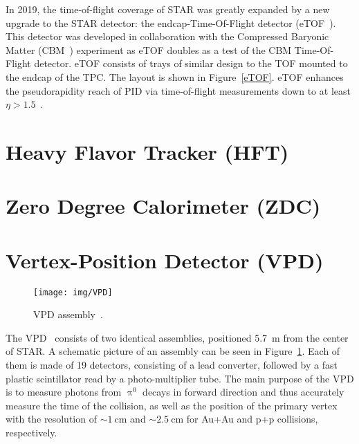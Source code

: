 In 2019, the time-of-flight coverage of STAR was greatly expanded by a new upgrade to the STAR detector: the endcap-Time-Of-Flight detector (eTOF~\cite{eTOF})\@. This detector was developed in collaboration with the Compressed Baryonic Matter (CBM~\cite{CBM}) experiment as eTOF doubles as a test of the CBM Time-Of-Flight detector. eTOF consists of trays of similar design to the TOF mounted to the endcap of the TPC\@. The layout is shown in Figure~\ref{eTOF}\@. eTOF enhances the pseudorapidity reach of PID via time-of-flight measurements down to at least $\eta > 1.5$~\cite{eTOF_LOI}\@.


\section{Heavy Flavor Tracker (HFT)\label{HFTsection}} 



\section{Zero Degree Calorimeter (ZDC)\label{ZDCsection}}






\section{Vertex-Position Detector (VPD)\label{VPD}}

\begin{figure}[!htb]
\begin{center}
 \texttt{[image: img/VPD]}\\
\end{center}
\caption[VPD assembly.]{\label{VPDassembly}VPD assembly~\cite{VPD}.}
\end{figure}

The VPD~\cite{VPD} consists of two identical assemblies, positioned \SI{5.7}{\metre} from the center of STAR\@. A schematic 
picture of an assembly can be seen in Figure~\ref{VPDassembly}. Each of them is made of 19 detectors, consisting of a lead 
converter, followed by a fast plastic scintillator read by a photo-multiplier tube. The main purpose of the VPD is to measure 
photons from $\uppi^0$ decays in forward direction and thus accurately measure the time of the collision, as well as 
the position of the primary vertex with the resolution of $\sim \SI{1}{\centi\metre}$ and  $\sim \SI{2.5}{\centi\metre}$ 
for Au+Au and p+p collisions, respectively.

